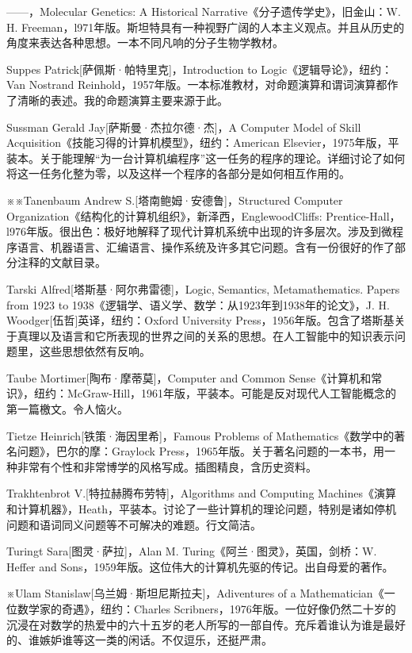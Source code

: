 \documentclass[
  12pt,
  twoside,
  openright,
  oldfontcommands,
]{memoir}
\begin{document}
------，Molecular Genetics: A Historical Narrative《分子遗传学史》，旧金山：W. H. Freeman，l971年版。斯坦特具有一种视野广阔的人本主义观点。并且从历史的角度来表达各种思想。一本不同凡响的分子生物学教材。

Suppes Patrick{[}萨佩斯·帕特里克{]}，Introduction to Logic《逻辑导论》，纽约：Van Nostrand Reinhold，1957年版。一本标准教材，对命题演算和谓词演算都作了清晰的表述。我的命题演算主要来源于此。

Sussman Gerald Jay{[}萨斯曼·杰拉尔德·杰{]}，A Computer Model of Skill Acquisition《技能习得的计算机模型》，纽约：American Elsevier，1975年版，平装本。关于能理解``为一台计算机编程序''这一任务的程序的理论。详细讨论了如何将这一任务化整为零，以及这样一个程序的各部分是如何相互作用的。

※※Tanenbaum Andrew S.{[}塔南鲍姆·安德鲁{]}，Structured Computer Organization《结构化的计算机组织》，新泽西，EnglewoodCliffs: Prentice-Hall，l976年版。很出色：极好地解释了现代计算机系统中出现的许多层次。涉及到微程序语言、机器语言、汇编语言、操作系统及许多其它问题。含有一份很好的作了部分注释的文献目录。

Tarski Alfred{[}塔斯基·阿尔弗雷德{]}，Logic, Semantics, Metamathematics. Papers from 1923 to 1938《逻辑学、语义学、数学：从1923年到1938年的论文》，J. H. Woodger{[}伍哲{]}英译，纽约：Oxford University Press，1956年版。包含了塔斯基关于真理以及语言和它所表现的世界之间的关系的思想。在人工智能中的知识表示问题里，这些思想依然有反响。

Taube Mortimer{[}陶布·摩蒂莫{]}，Computer and Common Sense《计算机和常识》，纽约：McGraw-Hill，1961年版，平装本。可能是反对现代人工智能概念的第一篇檄文。令人恼火。

Tietze Heinrich{[}铁策·海因里希{]}，Famous Problems of Mathematics《数学中的著名问题》，巴尔的摩：Graylock Press，1965年版。关于著名问题的一本书，用一种非常有个性和非常博学的风格写成。插图精良，含历史资料。

Trakhtenbrot V.{[}特拉赫腾布劳特{]}，Algorithms and Computing Machines《演算和计算机器》，Heath，平装本。讨论了一些计算机的理论问题，特别是诸如停机问题和语词同义问题等不可解决的难题。行文简洁。

Turingt Sara{[}图灵·萨拉{]}，Alan M. Turing《阿兰·图灵》，英国，剑桥：W. Heffer and Sons，1959年版。这位伟大的计算机先驱的传记。出自母爱的著作。

※Ulam Stanislaw{[}乌兰姆·斯坦尼斯拉夫{]}，Adiventures of a Mathematician《一位数学家的奇遇》，纽约：Charles Scribner\textquotesingle s，1976年版。一位好像仍然二十岁的沉浸在对数学的热爱中的六十五岁的老人所写的一部自传。充斥着谁认为谁是最好的、谁嫉妒谁等这一类的闲话。不仅逗乐，还挺严肃。
\end{document}
